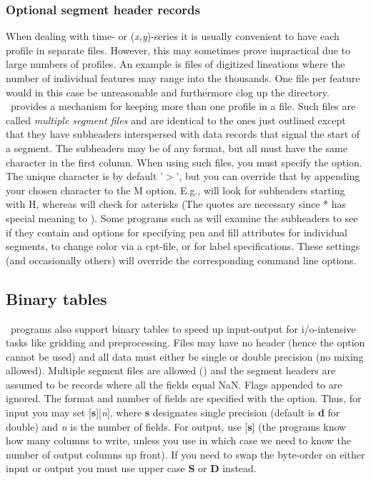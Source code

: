 \subsubsection{Optional segment header records}
When dealing with time- or (\emph{x,y})-series it is usually
convenient to have each profile in separate files.
However, this may sometimes prove impractical due to large numbers
of profiles.  An example is files of digitized lineations where
the number of individual features may range into the thousands.
One file per feature would in this case be unreasonable and
furthermore clog up the directory. \GMT\ provides a mechanism for
keeping more than one profile in a file.  Such files are called
\emph{multiple segment files} and are identical to the ones
just outlined except that they have subheaders interspersed with
data records that signal the start of a segment.
The subheaders may be of any format, but all must have the same
character in the first column.  When using such files, you must
specify the  option.  The unique character is by default
'$>$', but you can override that by appending your chosen character
to the M option.  E.g.,  will look for subheaders starting
with H, whereas  will check for asterisks (The quotes
are necessary since * has special meaning to \UNIX).  Some programs
such as  will examine the subheaders to see if they
contain  and  options for specifying pen and
fill attributes for individual segments,  to change
color via a cpt-file, or  for label specifications.  These settings
(and occasionally others) will override the corresponding command line options.

\subsection{Binary tables}

\GMT\ programs also support binary tables to speed up input-output
for i/o-intensive tasks like gridding and preprocessing.  Files
may have no header (hence the  option cannot be used)
and all data must either be single or double precision (no mixing
allowed).  Multiple segment files are allowed () and the
segment headers are assumed to be records where all the fields equal 
NaN.  Flags appended to  are ignored.  The format and number
of fields are specified with the
 option.  Thus, for input you may set [\textbf{s}][\emph{n}],
where \textbf{s} designates single precision (default is \textbf{d} for double) and
\emph{n} is the number of fields.  For output, use [\textbf{s}] 
(the programs know how many columns to write, unless you use  in which
case we need to know the number of output columns up front).  If you need
to swap the byte-order on either input or output you must use upper case
\textbf{S} or \textbf{D} instead.

